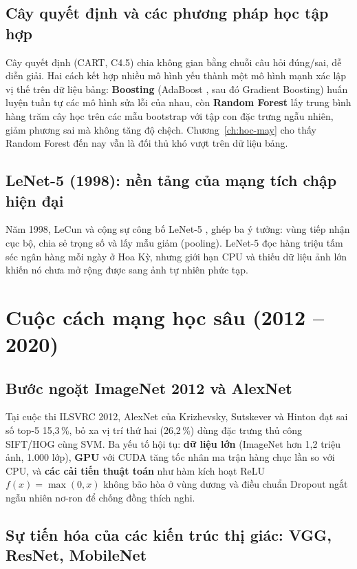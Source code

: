 \subsection{Cây quyết định và các phương pháp học tập hợp}

Cây quyết định (CART, C4.5) chia không gian bằng chuỗi câu hỏi đúng/sai, dễ diễn giải. Hai cách kết hợp nhiều mô hình
yếu thành một mô hình mạnh xác lập vị thế trên dữ liệu bảng: \textbf{Boosting} (AdaBoost \cite{freund1997}, sau đó
Gradient Boosting) huấn luyện tuần tự các mô hình sửa lỗi của nhau, còn \textbf{Random Forest} \cite{breiman2001}
lấy trung bình hàng trăm cây học trên các mẫu bootstrap với tập con đặc trưng ngẫu nhiên, giảm phương sai mà không
tăng độ chệch. Chương~\ref{ch:hoc-may} cho thấy Random Forest đến nay vẫn là đối thủ khó vượt trên dữ liệu bảng.

\subsection{LeNet-5 (1998): nền tảng của mạng tích chập hiện đại}

Năm 1998, LeCun và cộng sự công bố LeNet-5 \cite{lecun1998}, ghép ba ý tưởng: vùng tiếp nhận cục bộ, chia sẻ trọng số
và lấy mẫu giảm (pooling). LeNet-5 đọc hàng triệu tấm séc ngân hàng mỗi ngày ở Hoa Kỳ, nhưng giới hạn CPU và thiếu dữ
liệu ảnh lớn khiến nó chưa mở rộng được sang ảnh tự nhiên phức tạp.

\section{Cuộc cách mạng học sâu (2012 -- 2020)}

\subsection{Bước ngoặt ImageNet 2012 và AlexNet}

Tại cuộc thi ILSVRC 2012, AlexNet của Krizhevsky, Sutskever và Hinton \cite{krizhevsky2012} đạt sai số top-5 15,3\,\%,
bỏ xa vị trí thứ hai (26,2\,\%) dùng đặc trưng thủ công SIFT/HOG cùng SVM. Ba yếu tố hội tụ: \textbf{dữ liệu lớn}
(ImageNet hơn 1,2 triệu ảnh, 1.000 lớp), \textbf{GPU} với CUDA tăng tốc nhân ma trận hàng chục lần so với CPU, và
\textbf{các cải tiến thuật toán} như hàm kích hoạt ReLU $f(x) = \max(0, x)$ không bão hòa ở vùng dương và điều chuẩn
Dropout \cite{srivastava2014} ngắt ngẫu nhiên nơ-ron để chống đồng thích nghi.

\subsection{Sự tiến hóa của các kiến trúc thị giác: VGG, ResNet, MobileNet}

